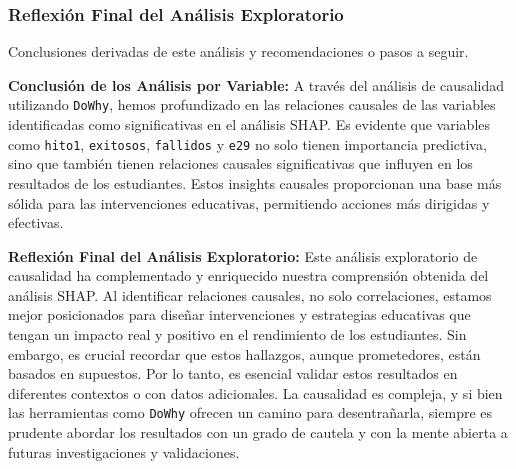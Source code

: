 \subsubsection{Reflexión Final del Análisis Exploratorio} Conclusiones derivadas de este análisis y recomendaciones o pasos a seguir.


\textbf{Conclusión de los Análisis por Variable:} A través del análisis de causalidad utilizando \texttt{DoWhy}, hemos profundizado en las relaciones causales de las variables identificadas como significativas en el análisis SHAP. Es evidente que variables como \texttt{hito1}, \texttt{exitosos}, \texttt{fallidos} y \texttt{e29} no solo tienen importancia predictiva, sino que también tienen relaciones causales significativas que influyen en los resultados de los estudiantes. Estos insights causales proporcionan una base más sólida para las intervenciones educativas, permitiendo acciones más dirigidas y efectivas.

\textbf{Reflexión Final del Análisis Exploratorio:} Este análisis exploratorio de causalidad ha complementado y enriquecido nuestra comprensión obtenida del análisis SHAP. Al identificar relaciones causales, no solo correlaciones, estamos mejor posicionados para diseñar intervenciones y estrategias educativas que tengan un impacto real y positivo en el rendimiento de los estudiantes. Sin embargo, es crucial recordar que estos hallazgos, aunque prometedores, están basados en supuestos. Por lo tanto, es esencial validar estos resultados en diferentes contextos o con datos adicionales. La causalidad es compleja, y si bien las herramientas como \texttt{DoWhy} ofrecen un camino para desentrañarla, siempre es prudente abordar los resultados con un grado de cautela y con la mente abierta a futuras investigaciones y validaciones.


